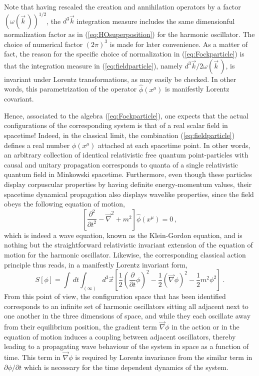 \documentclass[a4paper,11pt]{article}
\begin{document}
Note that having rescaled the creation and annihilation operators by
a factor $(\omega(\vec{k}\,))^{1/2}$, the $d^3\vec{k}$ integration
measure includes the same dimensionful normalization factor as in 
(\ref{eq:HOsuperposition}) for the harmonic oscillator. The choice of 
numerical factor $(2\pi)^3$ is made
for later convenience. As a matter of fact, the reason for the specific
choice of normalization in (\ref{eq:Fockparticle}) is that the
integration measure in (\ref{eq:fieldparticle}), namely
$d^3\vec{k}/2\omega(\vec{k}\,)$, is invariant under Lorentz transformations,
as may easily be checked. In other words, this parametrization of the
operator $\hat{\phi}(x^\mu)$ is manifestly Lorentz covariant.

Hence, associated to the algebra (\ref{eq:Fockparticle}), one expects
that the actual con\-fi\-gu\-ra\-tions of the corresponding system is that
of a real scalar field in spacetime! Indeed, in the classical limit,
the combination (\ref{eq:fieldparticle}) defines a real number $\phi(x^\mu)$
attached at each spacetime point. In other words, an arbitrary collection 
of identical relativistic free quantum point-particles with causal and 
unitary propagation corresponds to quanta of a single relativistic quantum 
field in Minkowski spacetime. Furthermore, even though these particles 
display corpuscular properties by having definite energy-momentum values, 
their spacetime dynamical propagation also displays wavelike properties, 
since the field obeys the following equation of motion,
\begin{equation}
\left[\frac{\partial^2}{\partial t^2}-\vec{\nabla}^2+m^2\right]
\hat{\phi}(x^\mu)=0\ ,
\end{equation}
which is indeed a wave equation, known as the Klein-Gordon equation,
and is nothing but the straightforward relativistic invariant extension
of the equation of motion for the harmonic oscillator. Likewise, the
corresponding classical action principle thus reads, in a manifestly Lorentz
invariant form,
\begin{equation}
S[\phi]=\int\,dt\int_{(\infty)}d^3\vec{x}
\left[\frac{1}{2}\left(\frac{\partial}{\partial t}\phi\right)^2-
\frac{1}{2}\left(\vec{\nabla}\phi\right)^2-\frac{1}{2}m^2\phi^2\right]\ .
\end{equation}
From this point of view, the configuration space that has been
identified corresponds to an infinite set of harmonic oscillators sitting
all adjacent next to one another in the three dimensions of space, 
and while they each oscillate away from their equilibrium position, 
the gradient term $\vec{\nabla}\phi$ in the action or in the equation of 
motion induces a coupling between adjacent oscillators, thereby leading to a 
propagating wave behaviour of the system in space as a function of time. 
This term in $\vec{\nabla}\phi$ is required by Lorentz invariance
from the similar term in $\partial\phi/\partial t$ which is necessary
for the time dependent dynamics of the system.
\end{document}
